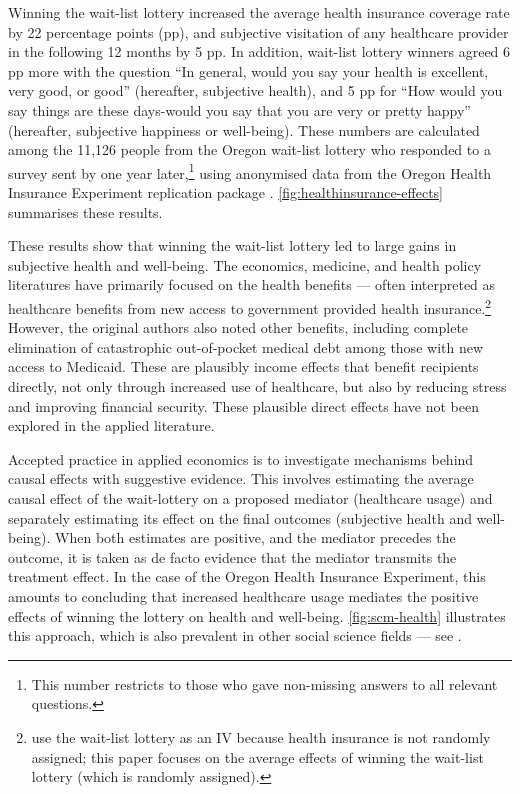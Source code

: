 Winning the wait-list lottery increased the average health insurance coverage rate by 22 percentage points (pp), and subjective visitation of any healthcare provider in the following 12 months by 5 pp.
In addition, wait-list lottery winners agreed 6 pp more with the question ``In general, would you say your health is excellent, very good, or good'' (hereafter, subjective health),
and 5 pp for ``How would you say things are these days-would you say that you are very  or pretty happy'' (hereafter, subjective happiness or well-being).
These numbers are calculated among the 11,126
%
people from the Oregon wait-list lottery who responded to a survey sent by \cite{finkelstein2008oregon} one year later,\footnote{
    This number restricts to those who gave non-missing answers to all relevant questions.
}
using anonymised data from the Oregon Health Insurance Experiment replication package \citep{icspr2014oregon}.
\autoref{fig:healthinsurance-effects} summarises these results.

These results show that winning the wait-list lottery led to large gains in subjective health and well-being.
The economics, medicine, and health policy literatures have primarily focused on the health benefits --- often interpreted as healthcare benefits from new access to government provided health insurance.\footnote{
    \cite{finkelstein2008oregon} use the wait-list lottery as an IV because health insurance is not randomly assigned; this paper focuses on the average effects of winning the wait-list lottery (which is randomly assigned).
}
However, the original authors also noted other benefits, including complete elimination of catastrophic out-of-pocket medical debt among those with new access to Medicaid.
These are plausibly income effects that benefit recipients directly, not only through increased use of healthcare, but also by reducing stress and improving financial security.
These plausible direct effects have not been explored in the applied literature.

Accepted practice in applied economics is to investigate mechanisms behind causal effects with suggestive evidence.
This involves estimating the average causal effect of the wait-lottery on a proposed mediator (healthcare usage) and separately estimating its effect on the final outcomes (subjective health and well-being).
When both estimates are positive, and the mediator precedes the outcome, it is taken as de facto evidence that the mediator transmits the treatment effect.
In the case of the Oregon Health Insurance Experiment, this amounts to concluding that increased healthcare usage mediates the positive effects of winning the lottery on health and well-being.
\autoref{fig:scm-health} illustrates this approach, which is also prevalent in other social science fields --- see \cite{blackwell2024assumption,green2010enough}.

